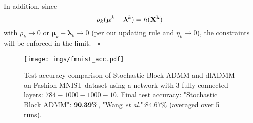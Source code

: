               In addition, since $$\rho_k(\bm \mu^k-\bm \lambda^k) = h(\mathbf{\boldsymbol{X}^k})$$ with $\rho_k \rightarrow 0$ or $\bm \mu_k-\bm \lambda_k \rightarrow 0$ (per our updating rule and $\eta_k\rightarrow 0$), the constraints will be enforced in the limit.      $\mbox{     } \square$   \\
              




   
% 


\begin{figure}[ht]
\begin{center}
\centerline{
\texttt{[image: imgs/fmnist\_acc.pdf]}
}
\caption{Test accuracy comparison of Stochastic Block ADMM and dlADMM on Fashion-MNIST dataset using a network with 3 fully-connected layers: $784-1000-1000-10$. Final test accuracy: "Stochastic Block ADMM": $\bf 90.39\%$, "Wang \textit{et al.}":$84.67 \%$ (averaged over 5 runs).}
\label{fig:fmnist_acc}
\end{center}
\end{figure}




